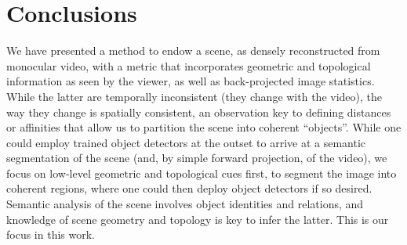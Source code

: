 \section{Conclusions}

We have presented a method to endow a scene, as densely reconstructed from monocular video, with a
metric that incorporates geometric and topological information as seen by the viewer, as well as
back-projected image statistics. While the latter are temporally inconsistent (they change with the
video), the way they change is spatially consistent, an observation key to defining distances or
affinities that allow us to partition the scene into coherent ``objects''. While one could employ
trained object detectors at the outset to arrive at a semantic segmentation of the scene (and, by
simple forward projection, of the video), we focus on low-level geometric and topological cues
first, to segment the image into coherent regions, where one could then deploy object detectors if
so desired. Semantic analysis of the scene involves object identities and relations, and knowledge
of scene geometry and topology is key to infer the latter. This is our focus in this work.

